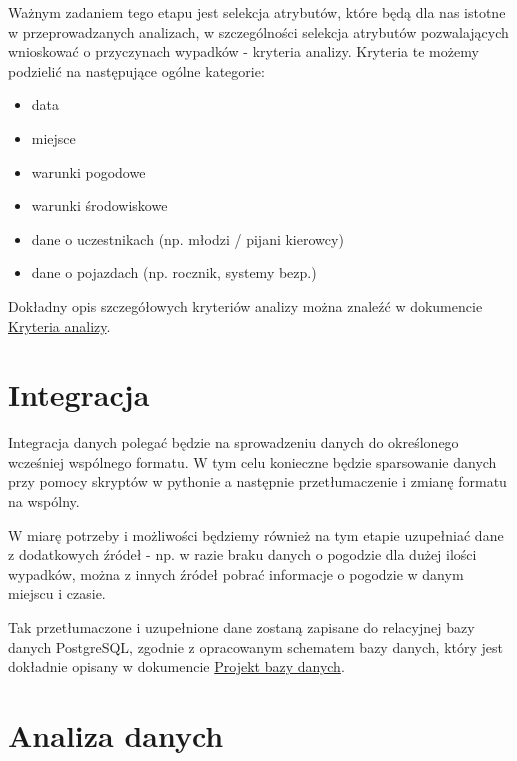 Ważnym zadaniem tego etapu jest selekcja atrybutów, które będą dla nas
istotne w przeprowadzanych analizach, w szczególności selekcja atrybutów
pozwalających wnioskować o przyczynach wypadków - kryteria analizy.
Kryteria te możemy podzielić na następujące ogólne kategorie:

\begin{itemize}
\itemsep1pt\parskip0pt
\item
  data\\
\item
  miejsce\\
\item
  warunki pogodowe\\
\item
  warunki środowiskowe\\
\item
  dane o uczestnikach (np. młodzi / pijani kierowcy)\\
\item
  dane o pojazdach (np. rocznik, systemy bezp.)
\end{itemize}

Dokładny opis szczegółowych kryteriów analizy można znaleźć w dokumencie
\href{Kryteria-analizy}{Kryteria analizy}.

\section{Integracja}\label{integracja}

Integracja danych polegać będzie na sprowadzeniu danych do określonego
wcześniej wspólnego formatu. W tym celu konieczne będzie sparsowanie
danych przy pomocy skryptów w pythonie a następnie przetłumaczenie i
zmianę formatu na wspólny.

W miarę potrzeby i możliwości będziemy również na tym etapie uzupełniać
dane z dodatkowych źródeł - np. w razie braku danych o pogodzie dla
dużej ilości wypadków, można z innych źródeł pobrać informacje o
pogodzie w danym miejscu i czasie.

Tak przetłumaczone i uzupełnione dane zostaną zapisane do relacyjnej
bazy danych PostgreSQL, zgodnie z opracowanym schematem bazy danych,
który jest dokładnie opisany w dokumencie
\href{Projekt-bazy-danych}{Projekt bazy danych}.

\section{Analiza danych}\label{analiza-danych}

